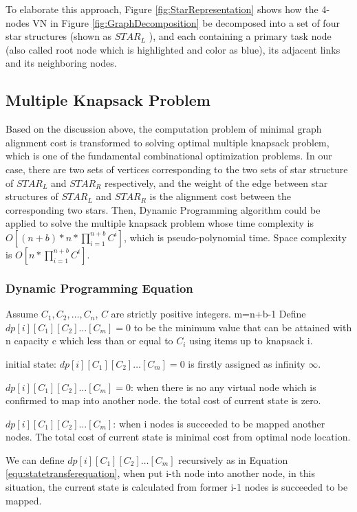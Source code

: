 To elaborate this approach, Figure \ref{fig:StarRepresentation} shows how the 4-nodes VN in Figure \ref{fig:GraphDecomposition} be decomposed into a set of four star structures (shown as $STAR_L$ ), and each containing a primary task node (also called root node which is highlighted and color as blue), its adjacent links and its neighboring nodes.

\subsection{Multiple Knapsack Problem}
Based on the discussion above, the computation problem of minimal graph alignment cost is transformed to solving optimal multiple knapsack problem, which is one of the fundamental combinational optimization problems. In our case, there are two sets of vertices corresponding to the two sets of star structure of $STAR_L$ and $STAR_R$ respectively, and the weight of the edge between star structures of $STAR_L$ and $STAR_R$ is the alignment cost between the corresponding two stars. Then, Dynamic Programming algorithm could be applied to solve the multiple knapsack problem whose time complexity is $O[(n+b)*n*\prod_{i=1}^{n+b}C^i]$, which is pseudo-polynomial time. Space complexity is $O[n*\prod_{i=1}^{n+b}C^i]$.


\subsubsection{Dynamic Programming Equation}
\label{lab:DynamicProgrammingEquation}
Assume $C_1,C_2,\ldots,C_n$, $C$ are strictly positive integers. m=n+b-1 Define $dp[i][{C_1}][{C_2}] \ldots [{C_m}]=0$ to be the minimum value that can be attained with n capacity c which less than or equal to $C_i$ using items up to knapsack i.

initial state: $dp[i][{C_1}][{C_2}] \ldots [{C_m}]=0$ is firstly assigned as infinity $\infty$.

$dp[i][{C_1}][{C_2}] \ldots [{C_m}]=0$: when there is no any virtual node which is confirmed to map into another node. the total cost of current state is zero.

$dp[i][{C_1}][{C_2}] \ldots [{C_m}]$: when  i nodes is succeeded to be mapped another nodes. The total cost of current state is minimal cost from optimal node location.

We can define $dp[i][{C_1}][{C_2}] \ldots [{C_m}]$ recursively as in Equation \ref{equ:statetransferequation}, when put i-th node into another node, in this situation, the current state is calculated from former i-1 nodes is succeeded to be mapped.

